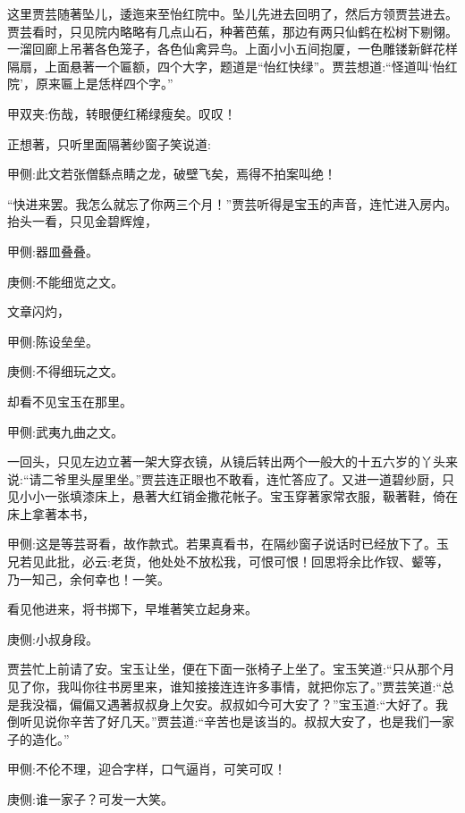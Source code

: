 \begin{parag}
    这里贾芸随著坠儿，逶迤来至怡红院中。坠儿先进去回明了，然后方领贾芸进去。贾芸看时，只见院内略略有几点山石，种著芭蕉，那边有两只仙鹤在松树下剔翎。一溜回廊上吊著各色笼子，各色仙禽异鸟。上面小小五间抱厦，一色雕镂新鲜花样隔扇，上面悬著一个匾额，四个大字，题道是“怡红快绿”。贾芸想道:“怪道叫‘怡红院’，原来匾上是恁样四个字。”\begin{note}甲双夹:伤哉，转眼便红稀绿瘦矣。叹叹！\end{note}正想著，只听里面隔著纱窗子笑说道:\begin{note}甲侧:此文若张僧繇点睛之龙，破壁飞矣，焉得不拍案叫绝！\end{note}“快进来罢。我怎么就忘了你两三个月！”贾芸听得是宝玉的声音，连忙进入房内。抬头一看，只见金碧辉煌，\begin{note}甲侧:器皿叠叠。\end{note}\begin{note}庚侧:不能细览之文。\end{note}文章闪灼，\begin{note}甲侧:陈设垒垒。\end{note}\begin{note}庚侧:不得细玩之文。\end{note}却看不见宝玉在那里。\begin{note}甲侧:武夷九曲之文。\end{note}一回头，只见左边立著一架大穿衣镜，从镜后转出两个一般大的十五六岁的丫头来说:“请二爷里头屋里坐。”贾芸连正眼也不敢看，连忙答应了。又进一道碧纱厨，只见小小一张填漆床上，悬著大红销金撒花帐子。宝玉穿著家常衣服，靸著鞋，倚在床上拿著本书，\begin{note}甲侧:这是等芸哥看，故作款式。若果真看书，在隔纱窗子说话时已经放下了。玉兄若见此批，必云:老货，他处处不放松我，可恨可恨！回思将余比作钗、颦等，乃一知己，余何幸也！一笑。\end{note}看见他进来，将书掷下，早堆著笑立起身来。\begin{note}庚侧:小叔身段。\end{note}贾芸忙上前请了安。宝玉让坐，便在下面一张椅子上坐了。宝玉笑道:“只从那个月见了你，我叫你往书房里来，谁知接接连连许多事情，就把你忘了。”贾芸笑道:“总是我没福，偏偏又遇著叔叔身上欠安。叔叔如今可大安了？”宝玉道:“大好了。我倒听见说你辛苦了好几天。”贾芸道:“辛苦也是该当的。叔叔大安了，也是我们一家子的造化。”\begin{note}甲侧:不伦不理，迎合字样，口气逼肖，可笑可叹！\end{note}\begin{note}庚侧:谁一家子？可发一大笑。\end{note}
\end{parag}


